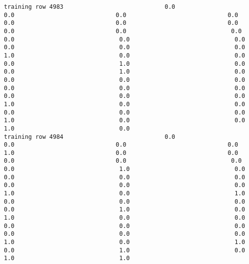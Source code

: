 \documentclass[11pt]{article}
\begin{document}
\begin{verbatim}
training row 4983                             0.0                             0.0                             0.0                             0.0                             0.0                             0.0                             0.0                             0.0                             0.0                              0.0                              0.0                              0.0                              0.0                              0.0                              0.0                              0.0                              1.0                              0.0                              0.0                              0.0                              1.0                              0.0                              0.0                              1.0                              0.0                              0.0                              0.0                              0.0                              0.0                              0.0                              0.0                              0.0                              0.0                              0.0                              1.0                              0.0                              0.0                              0.0                              0.0                              0.0                              1.0                              0.0                              0.0                              1.0                              0.0
training row 4984                             0.0                             0.0                             0.0                             0.0                             1.0                             0.0                             0.0                             0.0                             0.0                              0.0                              0.0                              1.0                              0.0                              0.0                              0.0                              0.0                              0.0                              0.0                              0.0                              1.0                              0.0                              1.0                              0.0                              0.0                              0.0                              0.0                              1.0                              0.0                              1.0                              0.0                              0.0                              0.0                              0.0                              0.0                              0.0                              0.0                              0.0                              1.0                              0.0                              1.0                              0.0                              1.0                              0.0                              1.0                              1.0

\end{verbatim}
\end{document}
